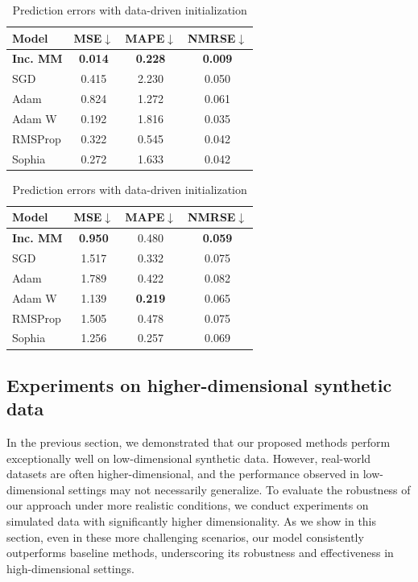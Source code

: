\documentclass{article}
\begin{document}
\begin{table}[H]
\centering
\begin{minipage}{0.45\textwidth}
    \centering
    \caption{Estimation errors with data-driven initialization}
    \begin{tabular}{|l|c|c|c|}
\hline
\textbf{Model} & \textbf{MSE$\downarrow$} & \textbf{MAPE$\downarrow$} & \textbf{NMRSE$\downarrow$} \\
\hline
\textbf{Inc. MM} & \textbf{0.014} & \textbf{0.228} & \textbf{0.009} \\
{SGD}       & {0.415} & {2.230} & {0.050} \\
{Adam}      & {0.824} & {1.272} & {0.061} \\
{Adam W}    & {0.192} & {1.816} & {0.035} \\
{RMSProp}   & {0.322} & {0.545} & {0.042} \\
{Sophia}    & {0.272} & {1.633} & {0.042} \\
\hline
\end{tabular}

    \label{tab_Kmean_tm}
\end{minipage}\hfill
\begin{minipage}{0.45\textwidth}
    \centering
    \caption{Prediction errors with data-driven initialization}
    \begin{tabular}{|l|c|c|c|}
\hline
\textbf{Model} & \textbf{MSE$\downarrow$} & \textbf{MAPE$\downarrow$} & \textbf{NMRSE$\downarrow$} \\
\hline
\textbf{Inc. MM} & \textbf{0.950} & 0.480 & \textbf{0.059} \\
SGD       & 1.517 & 0.332 & 0.075 \\
Adam      & 1.789 & 0.422 & 0.082 \\
Adam W    & 1.139 & \textbf{0.219} & 0.065 \\
RMSProp   & 1.505 & 0.478 & 0.075 \\
Sophia    & 1.256 & 0.257 & 0.069 \\
\hline
\end{tabular}

    \label{tab_Kmean_tt}
\end{minipage}
\end{table}

\subsection{Experiments on higher-dimensional synthetic data}

In the previous section, we demonstrated that our proposed methods perform exceptionally well on low-dimensional synthetic data. However, real-world datasets are often higher-dimensional, and the performance observed in low-dimensional settings may not necessarily generalize. To evaluate the robustness of our approach under more realistic conditions, we conduct experiments on simulated data with significantly higher dimensionality. As we show in this section, even in these more challenging scenarios, our model consistently outperforms baseline methods, underscoring its robustness and effectiveness in high-dimensional settings.
\end{document}
